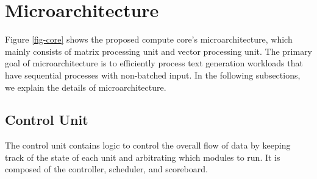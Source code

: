 

\section{Microarchitecture}
\label{microarchitecture}

Figure \ref{fig-core} shows the proposed compute core's microarchitecture, which mainly consists of matrix processing unit and vector processing unit. The primary goal of microarchitecture is to efficiently process text generation workloads that have sequential processes with non-batched input. In the following subsections, we explain the details of microarchitecture.



\subsection{Control Unit} \label{microarchitecture_control}
The control unit contains logic to control the overall flow of data by keeping track of the state of each unit and arbitrating which modules to run. It is composed of the controller, scheduler, and scoreboard.

